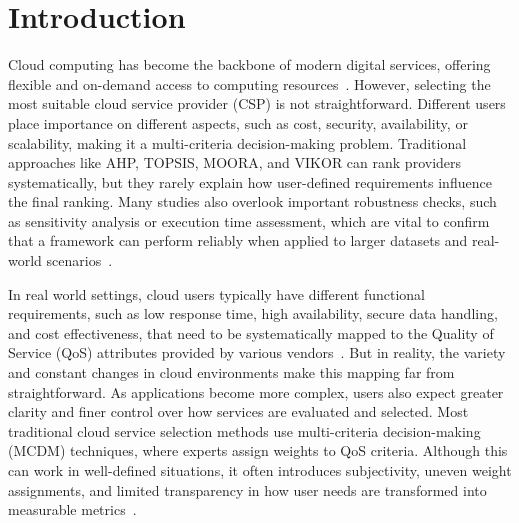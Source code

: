 \documentclass[twocolumn]{svjour3}
\begin{document}



\section{Introduction}

Cloud computing has become the backbone of modern digital services, offering flexible and on-demand access to computing resources~\cite{varghese2018next,phaphoom2013foundations}. However, selecting the most suitable cloud service provider (CSP) is not straightforward. Different users place importance on different aspects, such as cost, security, availability, or scalability, making it a multi-criteria decision-making problem. Traditional approaches like AHP, TOPSIS, MOORA, and VIKOR can rank providers systematically, but they rarely explain how user-defined requirements influence the final ranking. Many studies also overlook important robustness checks, such as sensitivity analysis or execution time assessment, which are vital to confirm that a framework can perform reliably when applied to larger datasets and real-world scenarios~\cite{garg2013framework, hussain2022cloud,kumar2017prioritizing}.

In real world settings, cloud users typically have different functional requirements, such as low response time, high availability, secure data handling, and cost effectiveness, that need to be systematically mapped to the Quality of Service (QoS) attributes provided by various vendors~\cite{kumar2021ccs,tiwari2021g}. But in reality, the variety and constant changes in cloud environments make this mapping far from straightforward. As applications become more complex, users also expect greater clarity and finer control over how services are evaluated and selected. Most traditional cloud service selection methods use multi-criteria decision-making (MCDM) techniques, where experts assign weights to QoS criteria. Although this can work in well-defined situations, it often introduces subjectivity, uneven weight assignments, and limited transparency in how user needs are transformed into measurable metrics~\cite{mostafa2022hybrid}.
\end{document}
